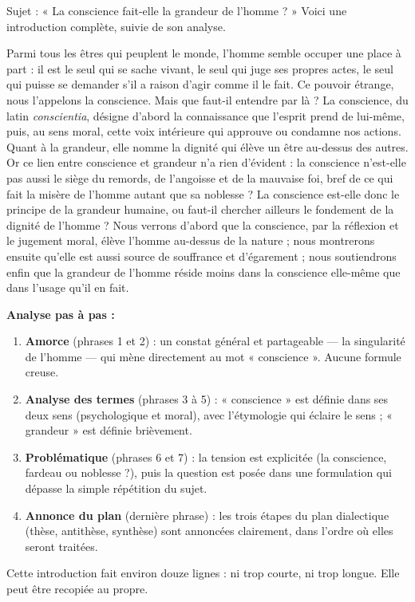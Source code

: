 \documentclass[11pt]{article}
\begin{document}
\begin{experience}
Sujet : « La conscience fait-elle la grandeur de l'homme ? » Voici une introduction complète, suivie de son analyse.

\medskip
\guillemotleft Parmi tous les êtres qui peuplent le monde, l'homme semble occuper une place à part : il est le seul qui se sache vivant, le seul qui juge ses propres actes, le seul qui puisse se demander s'il a raison d'agir comme il le fait. Ce pouvoir étrange, nous l'appelons la conscience. Mais que faut-il entendre par là ? La conscience, du latin \emph{conscientia}, désigne d'abord la connaissance que l'esprit prend de lui-même, puis, au sens moral, cette voix intérieure qui approuve ou condamne nos actions. Quant à la grandeur, elle nomme la dignité qui élève un être au-dessus des autres. Or ce lien entre conscience et grandeur n'a rien d'évident : la conscience n'est-elle pas aussi le siège du remords, de l'angoisse et de la mauvaise foi, bref de ce qui fait la misère de l'homme autant que sa noblesse ? La conscience est-elle donc le principe de la grandeur humaine, ou faut-il chercher ailleurs le fondement de la dignité de l'homme ? Nous verrons d'abord que la conscience, par la réflexion et le jugement moral, élève l'homme au-dessus de la nature ; nous montrerons ensuite qu'elle est aussi source de souffrance et d'égarement ; nous soutiendrons enfin que la grandeur de l'homme réside moins dans la conscience elle-même que dans l'usage qu'il en fait. \guillemotright

\medskip
\textbf{Analyse pas à pas :}
\begin{enumerate}
\item \textbf{Amorce} (phrases 1 et 2) : un constat général et partageable — la singularité de l'homme — qui mène directement au mot « conscience ». Aucune formule creuse.
\item \textbf{Analyse des termes} (phrases 3 à 5) : « conscience » est définie dans ses deux sens (psychologique et moral), avec l'étymologie qui éclaire le sens ; « grandeur » est définie brièvement.
\item \textbf{Problématique} (phrases 6 et 7) : la tension est explicitée (la conscience, fardeau ou noblesse ?), puis la question est posée dans une formulation qui dépasse la simple répétition du sujet.
\item \textbf{Annonce du plan} (dernière phrase) : les trois étapes du plan dialectique (thèse, antithèse, synthèse) sont annoncées clairement, dans l'ordre où elles seront traitées.
\end{enumerate}
Cette introduction fait environ douze lignes : ni trop courte, ni trop longue. Elle peut être recopiée au propre.
\end{experience}
\end{document}
